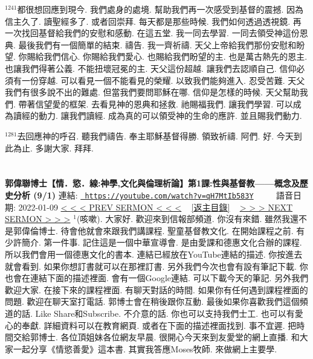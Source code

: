 \documentclass{book}
\begin{document}
$^{1241}$都很想回應到現今.
我們處身的處境.
幫助我們再一次感受到基督的震撼.
因為信主久了.
讀聖經多了.
或者回崇拜.
每天都是那些時候.
我們如何透過透視鏡.
再一次找回基督給我們的安慰和感動.
在這五堂.
我一同去學習.
一同去領受神這份恩典.
最後我們有一個簡單的結束.
禱告.
我一齊祈禱.
天父上帝給我們那份安慰和盼望.
你賜給我們信心.
你賜給我們愛心.
也賜給我們盼望的主.
也是萬古熱先的恩主.
也讓我們得著公義.
不能扭壞冠冕的主.
天父這份超越.
讓我們去認順自己.
信仰必須有一份穿越.
可以看見一個不能看見的榮耀.
以致我們能夠進入.
忍受苦難.
天父我們有很多說不出的難處.
但當我們要問耶穌在哪.
信仰是怎樣的時候.
天父幫助我們.
帶著信望愛的框架.
去看見神的恩典和拯救.
祂賜福我們.
讓我們學習.
可以成為讀經的動力.
讓我們讀經.
成為真的可以領受神的生命的應許.
並且賜我們動力.

$^{1281}$去回應神的呼召.
聽我們禱告.
奉主耶穌基督得勝.
領致祈禱.
阿們.
好.
今天到此為止.
多謝大家.
拜拜.
\newpage



\section{}
\label{sec:qH7MtIb583Y}
\textbf{郭偉聯博士【情．慾．線:神學,文化與倫理析論】第1課:性與基督教——概念及歷史分析 (9/1)}
\newline
\newline
連結: \href{https://youtube.com/watch?v=qH7MtIb583Y}{\texttt{ https://youtube.com/watch?v=qH7MtIb583Y}} ~~~~ 語音日期: 2022-01-09 
\newline
\newline
\hyperref[sec:MITfS88PZDg]{\small{< < < PREV SERMON < < <}}
~
\hyperref[sec:index]{\small{[返主目錄]}}
~
\hyperref[sec:KR0XbIoYouc]{\small{> > > NEXT SERMON > > >}}
\newline
\newline
$^{1}$(咳嗽).
大家好.
歡迎來到信報部頻道.
你沒有來錯.
雖然我還不是郭偉倫博士.
待會他就會來跟我們講課程.
聖童基督教文化.
在開始課程之前.
有少許簡介.
第一件事.
記住這是一個中華宣導會.
是由愛課和德惠文化合辦的課程.
所以我們會用一個德惠文化的書本.
連結已經放在YouTube連結的描述.
你按進去就會看到.
如果你想訂書就可以在那裡訂書.
另外我們今次也會有設有筆記下載.
你也會在連結下面的描述裡面.
會有一個Google連結.
可以下載今天的筆記.
另外我們歡迎大家.
在接下來的課程裡面.
有聊天對話的時間.
如果你有任何遇到課程裡面的問題.
歡迎在聊天室打電話.
郭博士會在稍後跟你互動.
最後如果你喜歡我們這個頻道的話.
Like Share和Subscribe.
不介意的話.
你也可以支持我們士工.
也可以有愛心的奉獻.
詳細資料可以在教育網頁.
或者在下面的描述裡面找到.
事不宜遲.
把時間交給郭博士.
各位頂姐妹各位網友早晨.
很開心今天來到友愛堂的網上直播.
和大家一起分享《情慾善愛》這本書.
其實我答應Moses牧師.
來做網上主要學.
\end{document}
